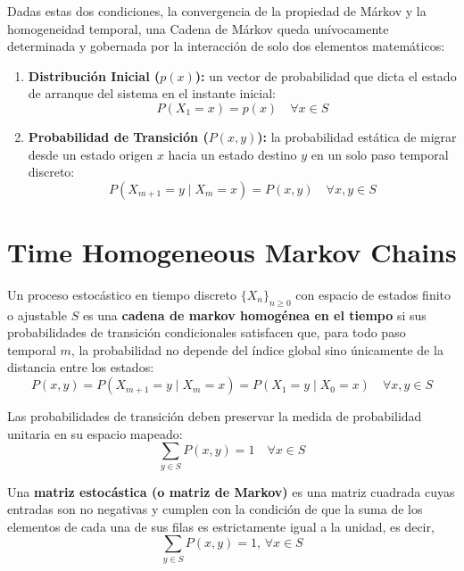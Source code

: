 \documentclass[10pt]{book}
\begin{document}
Dadas estas dos condiciones, la convergencia de la propiedad de Márkov y la homogeneidad temporal, una Cadena de Márkov queda unívocamente determinada y gobernada por la interacción de solo dos elementos matemáticos:
\begin{enumerate}
    \item \textbf{Distribución Inicial ($p(x)$):} un vector de probabilidad que dicta el estado de arranque del sistema en el instante inicial:
    \begin{equation*}
        P(X_1 = x) = p(x) \quad \forall x \in S
    \end{equation*}
    \item \textbf{Probabilidad de Transición ($P(x,y)$):} la probabilidad estática de migrar desde un estado origen $x$ hacia un estado destino $y$ en un solo paso temporal discreto:
    \begin{equation*}
        P(X_{m+1} = y \mid X_m = x) = P(x, y) \quad \forall x,y \in S
    \end{equation*}
\end{enumerate}


\section{Time Homogeneous Markov Chains}

\begin{definicion}
    Un proceso estocástico en tiempo discreto $\{X_n\}_{n \ge 0}$ con espacio de estados finito o ajustable $S$ es una \textbf{cadena de markov homogénea en el tiempo} si sus probabilidades de transición condicionales satisfacen que, para todo paso temporal $m$, la probabilidad no depende del índice global sino únicamente de la distancia entre los estados:
    \begin{equation*}
        P(x, y) = P(X_{m+1} = y \mid X_m = x) = P(X_1 = y \mid X_0 = x) \quad \forall x, y \in S
    \end{equation*}
\end{definicion}



\noindent Las probabilidades de transición deben preservar la medida de probabilidad unitaria en su espacio mapeado:
\begin{equation*}
    \sum_{y \in S} P(x, y) = 1 \quad \forall x \in S
\end{equation*}

\begin{definicion}
    Una \textbf{matriz estocástica (o matriz de Markov)} es una matriz cuadrada cuyas entradas son no negativas y cumplen con la condición de que la suma de los elementos de cada una de sus filas es estrictamente igual a la unidad, es decir,
    $$\sum_{y \in S} P(x, y) = 1, \, \forall x \in S$$
\end{definicion}
\end{document}

